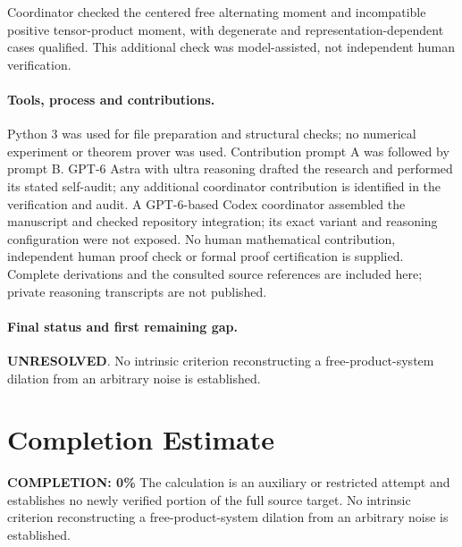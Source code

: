 \documentclass[11pt]{article}
\begin{document}
Coordinator checked the centered free alternating moment and incompatible positive tensor-product moment, with degenerate and representation-dependent cases qualified. This additional check was model-assisted, not independent human verification.

\paragraph{Tools, process and contributions.}
Python 3 was used for file preparation and structural checks; no numerical experiment or theorem prover was used. Contribution prompt A was followed by prompt B. GPT-6 Astra with ultra reasoning drafted the research and performed its stated self-audit; any additional coordinator contribution is identified in the verification and audit. A GPT-6-based Codex coordinator assembled the manuscript and checked repository integration; its exact variant and reasoning configuration were not exposed. No human mathematical contribution, independent human proof check or formal proof certification is supplied. Complete derivations and the consulted source references are included here; private reasoning transcripts are not published.

\paragraph{Final status and first remaining gap.}
\textbf{UNRESOLVED}. No intrinsic criterion reconstructing a free-product-system dilation from an arbitrary noise is established.

\section{Completion Estimate}
\noindent\textbf{COMPLETION: 0\%}
The calculation is an auxiliary or restricted attempt and establishes no newly verified portion of the full source target. No intrinsic criterion reconstructing a free-product-system dilation from an arbitrary noise is established.
\end{document}
